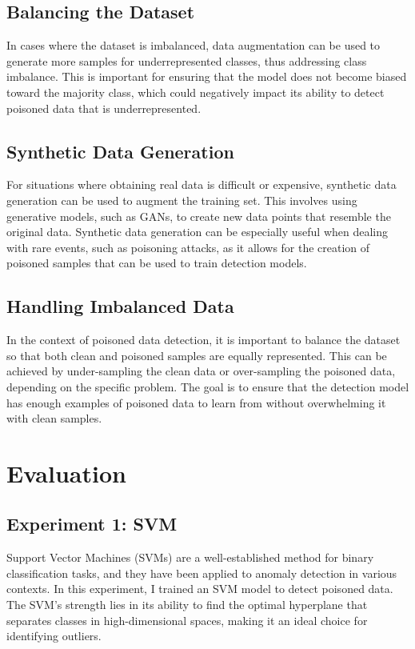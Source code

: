 \documentclass[14]{article}
\begin{document}
\subsection{Balancing the Dataset}
In cases where the dataset is imbalanced, data augmentation can be used to generate more samples for underrepresented classes, thus addressing class imbalance. This is important for ensuring that the model does not become biased toward the majority class, which could negatively impact its ability to detect poisoned data that is underrepresented.

\subsection{Synthetic Data Generation}
For situations where obtaining real data is difficult or expensive, synthetic data generation can be used to augment the training set. This involves using generative models, such as GANs, to create new data points that resemble the original data. Synthetic data generation can be especially useful when dealing with rare events, such as poisoning attacks, as it allows for the creation of poisoned samples that can be used to train detection models.

\subsection{Handling Imbalanced Data}
In the context of poisoned data detection, it is important to balance the dataset so that both clean and poisoned samples are equally represented. This can be achieved by under-sampling the clean data or over-sampling the poisoned data, depending on the specific problem. The goal is to ensure that the detection model has enough examples of poisoned data to learn from without overwhelming it with clean samples.


\section{Evaluation}

\subsection{Experiment 1: SVM}

Support Vector Machines (SVMs) are a well-established method for binary classification tasks, and they have been applied to anomaly detection in various contexts. In this experiment, I trained an SVM model to detect poisoned data. The SVM’s strength lies in its ability to find the optimal hyperplane that separates classes in high-dimensional spaces, making it an ideal choice for identifying outliers.
\end{document}
